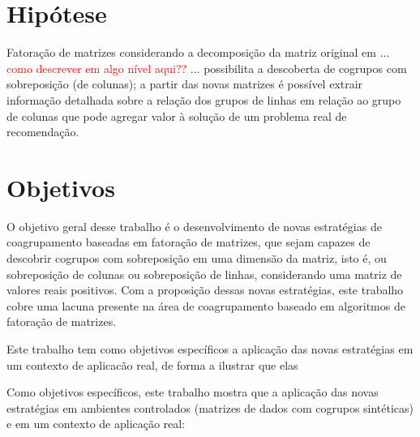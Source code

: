 \documentclass[
    12pt,                %
    oneside,            %
    a4paper,            %
    english,            %
    brazil                %
    ]{abntex2ppgsi}
\begin{document}

\section{Hipótese}

Fatoração de matrizes considerando a decomposição da matriz original em ... \textcolor{red}{como descrever em algo nível aqui??} ... possibilita a descoberta de cogrupos com sobreposição (de colunas); a partir das novas matrizes é possível extrair informação detalhada sobre a relação dos grupos de linhas em relação ao grupo de colunas que pode agregar valor à solução de um problema real de recomendação.



\section{Objetivos}

O objetivo geral desse trabalho é o desenvolvimento de novas estratégias de coagrupamento baseadas em fatoração de matrizes, que sejam capazes de descobrir cogrupos com sobreposição em uma dimensão da matriz, isto é, ou sobreposição de colunas ou sobreposição de linhas, considerando uma matriz de valores reais positivos. Com a proposição dessas novas estratégias, este trabalho cobre uma lacuna presente na área de coagrupamento baseado em algoritmos de fatoração de matrizes.


Este trabalho tem como objetivos específicos a aplicação das novas estratégias em um contexto de aplicacão real, de forma a ilustrar que elas

Como objetivos específicos, este trabalho mostra que a aplicação das novas estratégias em ambientes controlados (matrizes de dados com cogrupos sintéticas) e em um contexto de aplicação real:
\end{document}
